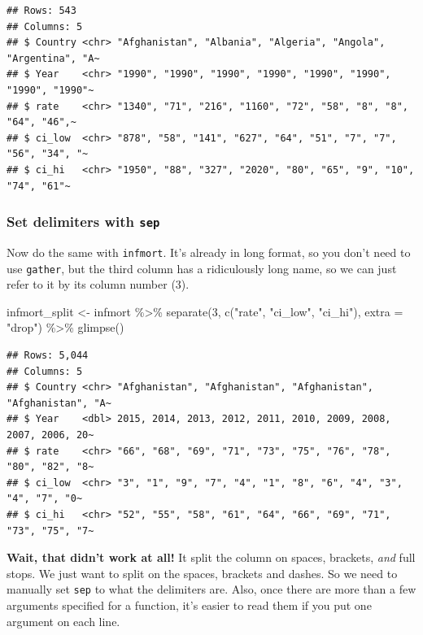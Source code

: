 \documentclass[
  oneside]{book}
\newenvironment{Shaded}{\begin{snugshade}}{\end{snugshade}}
\newcommand{\AttributeTok}[1]{\textcolor[rgb]{0.77,0.63,0.00}{#1}}
\newcommand{\DecValTok}[1]{\textcolor[rgb]{0.00,0.00,0.81}{#1}}
\newcommand{\FunctionTok}[1]{\textcolor[rgb]{0.00,0.00,0.00}{#1}}
\newcommand{\NormalTok}[1]{#1}
\newcommand{\OtherTok}[1]{\textcolor[rgb]{0.56,0.35,0.01}{#1}}
\newcommand{\SpecialCharTok}[1]{\textcolor[rgb]{0.00,0.00,0.00}{#1}}
\newcommand{\StringTok}[1]{\textcolor[rgb]{0.31,0.60,0.02}{#1}}
\begin{document}
\begin{verbatim}
## Rows: 543
## Columns: 5
## $ Country <chr> "Afghanistan", "Albania", "Algeria", "Angola", "Argentina", "A~
## $ Year    <chr> "1990", "1990", "1990", "1990", "1990", "1990", "1990", "1990"~
## $ rate    <chr> "1340", "71", "216", "1160", "72", "58", "8", "8", "64", "46",~
## $ ci_low  <chr> "878", "58", "141", "627", "64", "51", "7", "7", "56", "34", "~
## $ ci_hi   <chr> "1950", "88", "327", "2020", "80", "65", "9", "10", "74", "61"~
\end{verbatim}

\hypertarget{sep}{%
\subsubsection{\texorpdfstring{Set delimiters with \texttt{sep}}{Set delimiters with sep}}\label{sep}}

Now do the same with \texttt{infmort}. It's already in long format, so you don't need to use \texttt{gather}, but the third column has a ridiculously long name, so we can just refer to it by its column number (3).

\begin{Shaded}
\begin{Highlighting}[]
\NormalTok{infmort\_split }\OtherTok{\textless{}{-}}\NormalTok{ infmort }\SpecialCharTok{\%\textgreater{}\%}
  \FunctionTok{separate}\NormalTok{(}\DecValTok{3}\NormalTok{, }\FunctionTok{c}\NormalTok{(}\StringTok{"rate"}\NormalTok{, }\StringTok{"ci\_low"}\NormalTok{, }\StringTok{"ci\_hi"}\NormalTok{), }\AttributeTok{extra =} \StringTok{"drop"}\NormalTok{) }\SpecialCharTok{\%\textgreater{}\%}
  \FunctionTok{glimpse}\NormalTok{()}
\end{Highlighting}
\end{Shaded}

\begin{verbatim}
## Rows: 5,044
## Columns: 5
## $ Country <chr> "Afghanistan", "Afghanistan", "Afghanistan", "Afghanistan", "A~
## $ Year    <dbl> 2015, 2014, 2013, 2012, 2011, 2010, 2009, 2008, 2007, 2006, 20~
## $ rate    <chr> "66", "68", "69", "71", "73", "75", "76", "78", "80", "82", "8~
## $ ci_low  <chr> "3", "1", "9", "7", "4", "1", "8", "6", "4", "3", "4", "7", "0~
## $ ci_hi   <chr> "52", "55", "58", "61", "64", "66", "69", "71", "73", "75", "7~
\end{verbatim}

\textbf{Wait, that didn't work at all!} It split the column on spaces, brackets, \emph{and} full stops. We just want to split on the spaces, brackets and dashes. So we need to manually set \texttt{sep} to what the delimiters are. Also, once there are more than a few arguments specified for a function, it's easier to read them if you put one argument on each line.
\end{document}
